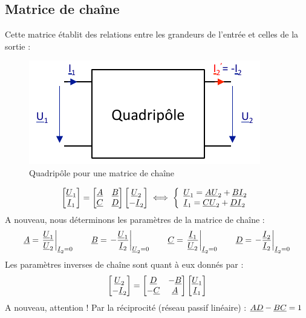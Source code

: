 \documentclass[12pt,a4paper]{article}
\newcommand{\ui}{\uline{I} }
\newcommand{\uu}{\uline{U} }
\newcommand{\ua}{\uline{A} }
\newcommand{\ub}{\uline{B} }
\newcommand{\uc}{\uline{C} }
\newcommand{\ud}{\uline{D} }
\begin{document}
\subsection[Matrice de chaîne (transmission)]{Matrice de chaîne}
Cette matrice établit des relations entre les grandeurs de l'entrée et celles de la sortie :
\begin{figure}[!h]
	\centering
	\includegraphics[scale=0.7]{images/matrice_chaine}
	\caption{Quadripôle pour une matrice de chaîne}
\end{figure}
\begin{equation}
	\begin{bmatrix}
	\uu_1\\
	\ui_1
	\end{bmatrix} = 
	\begin{bmatrix}
		\ua & \ub\\
		\uc & \ud
	\end{bmatrix} \begin{bmatrix}
	\uu_2\\
	-\ui_2
	\end{bmatrix} \iff \left\{\begin{array}{l}
\uu_1 = \ua\uu_2 + \ub\ui_2\\
\ui_1 = \uc\uu_2 + \ud\ui_2
\end{array}\right.
\label{equ: matrice chaine}
\end{equation}
A nouveau, nous déterminons les paramètres de la matrice de chaîne :
\begin{equation}
	\ua = \left.\frac{\uu_1}{\uu_2}\right|_{\ui_2 = 0} \qquad
	\ub = \left.-\frac{\uu_1}{\ui_2}\right|_{\uu_2 = 0} \qquad
	\uc = \left.\frac{\ui_1}{\uu_2}\right|_{\ui_2 = 0} \qquad
	\ud = \left.-\frac{\ui_2}{\ui_2}\right|_{\ui_2 = 0}
\end{equation}
Les paramètres inverses de chaîne sont quant à eux donnés par :
\begin{equation}
	\begin{bmatrix}
	\uu_2\\
	-\ui_2
	\end{bmatrix} = 
	\begin{bmatrix}
		\ud & -\ub\\
		-\uc & \ua
	\end{bmatrix} \begin{bmatrix}
	\uu_1\\
	\ui_1
	\end{bmatrix}
\end{equation}
A nouveau, attention ! Par la réciprocité (réseau passif linéaire) : $\ua\ud - \ub\uc = 1$
\end{document}
